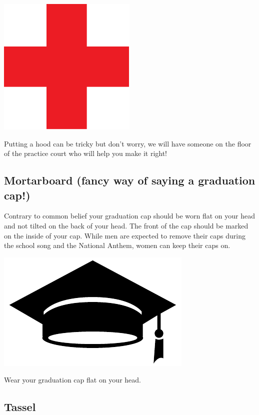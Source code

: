 \documentclass{tufte-handout}
\begin{document}
\begin{marginfigure}[-12\baselineskip]%
  \includegraphics[width=.5\linewidth]{red-cross}
  \caption{\linespread{1.3}\selectfont{}Putting a hood can be tricky but don't worry, we will have someone on the floor of the practice court who will help you make it right!}
  \label{fig:help}
\end{marginfigure}

\subsection{Mortarboard (fancy way of saying a graduation cap!)}
Contrary to common belief your graduation cap should be worn flat on your head and not tilted on the back of your head. The front of the cap should be marked on the inside of your cap.
While men are expected to remove their caps during the school song and the National Anthem, women can keep their caps on.

\begin{marginfigure}[-10\baselineskip]%
  \includegraphics[width=.5\linewidth]{cap-flat}
  \caption{\linespread{1.3}\selectfont{}Wear your graduation cap flat on your head.}
  \label{fig:flat}
\end{marginfigure}

\subsection{Tassel}
\end{document}
